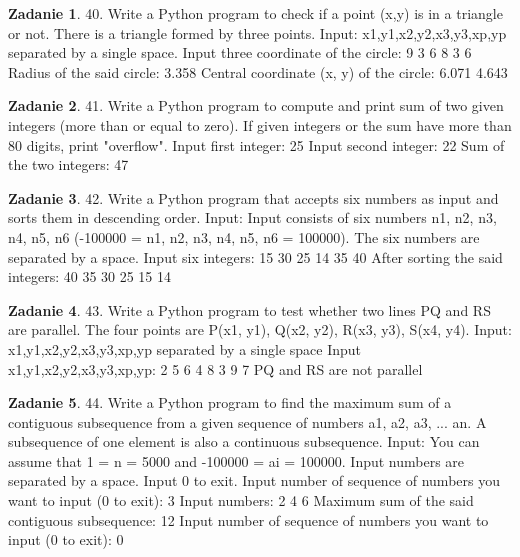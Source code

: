 \documentclass[11pt]{article}
\theoremstyle{definition}
\newtheorem{zadanie}{Zadanie}
\begin{document}
\begin{zadanie}


40. Write a Python program to check if a point (x,y) is in a triangle or not. There is a triangle formed by three points. 
Input:
x1,y1,x2,y2,x3,y3,xp,yp separated by a single space.
Input three coordinate of the circle:
9 3 6 8 3 6
Radius of the said circle:
3.358
Central coordinate (x, y) of the circle:
6.071 4.643

\end{zadanie}

\begin{zadanie}


41. Write a Python program to compute and print sum of two given integers (more than or equal to zero). If given integers or the sum have more than 80 digits, print "overflow". 
Input first integer:
25
Input second integer:
22
Sum of the two integers: 47

\end{zadanie}

\begin{zadanie}


42. Write a Python program that accepts six numbers as input and sorts them in descending order. 
Input:
Input consists of six numbers n1, n2, n3, n4, n5, n6 (-100000 = n1, n2, n3, n4, n5, n6 = 100000). The six numbers are separated by a space.
Input six integers:
15 30 25 14 35 40
After sorting the said integers:
40 35 30 25 15 14

\end{zadanie}

\begin{zadanie}


43. Write a Python program to test whether two lines PQ and RS are parallel. The four points are P(x1, y1), Q(x2, y2), R(x3, y3), S(x4, y4). 
Input:
x1,y1,x2,y2,x3,y3,xp,yp separated by a single space
Input x1,y1,x2,y2,x3,y3,xp,yp:
2 5 6 4 8 3 9 7
PQ and RS are not parallel

\end{zadanie}

\begin{zadanie}


44. Write a Python program to find the maximum sum of a contiguous subsequence from a given sequence of numbers a1, a2, a3, ... an. A subsequence of one element is also a continuous subsequence. 
Input:
You can assume that 1 = n = 5000 and -100000 = ai = 100000.
Input numbers are separated by a space.
Input 0 to exit.
Input number of sequence of numbers you want to input (0 to exit):
3
Input numbers:
2
4
6
Maximum sum of the said contiguous subsequence:
12 Input number of sequence of numbers you want to input (0 to exit):
0

\end{zadanie}
\end{document}
